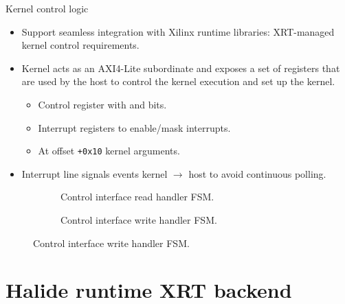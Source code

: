 \documentclass[8pt,a4paper,oneside,hidelinks,aspectratio=169,dvipsnames]{beamer}
\newcommand{\code}[1]{\texttt{\detokenize{#1}}}
\newcommand{\codecpp}[1]{\texttt{#1}}
\begin{document}
\begin{frame}{Kernel control logic}
  \begin{itemize}
    \item Support seamless integration with Xilinx runtime libraries: XRT-managed kernel control requirements.
    \item Kernel acts as an AXI4-Lite subordinate and exposes a set of registers that are used by the host to control the kernel execution and set up the kernel.
          \begin{itemize}
            \item Control register with \code{start} and \code{done} bits.
            \item Interrupt registers to enable/mask interrupts.
            \item At offset \codecpp{+0x10} kernel arguments.
          \end{itemize}
    \item Interrupt line signals events kernel $\rightarrow$ host to avoid continuous polling.
  \end{itemize}
  \begin{figure}[H]
    \begin{minipage}[H]{\textwidth}
      \centering
      \begin{subfigure}[t]{.45\textwidth}
        \centering
        \scalebox{.5}{}
        \caption{Control interface read handler FSM.}
      \end{subfigure}
      \begin{subfigure}[t]{.45\textwidth}
        \centering
        \scalebox{.5}{}
        \caption{Control interface write handler FSM.}
      \end{subfigure}
    \end{minipage}
  \end{figure}
\end{frame}

\section{Halide runtime XRT backend}
\end{document}
